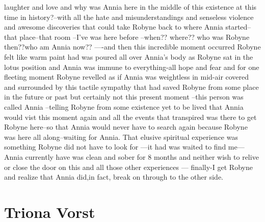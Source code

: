 \documentclass[12pt]{book}
\begin{document}
laughter and love and why was Annia here in the middle of this existence at this time in history?--with all the hate and misunderstandings and senseless violence and awesome discoveries that could take Robyne back to where Annia started--that place--that room --I've was here before --when?? where?? who was Robyne then??who am Annia now?? ----and then this incredible moment occurred Robyne felt like warm paint had was poured all over Annia's body as Robyne sat in the lotus position and Annia was immune to everything-all hope and fear and for one fleeting moment Robyne revelled as if Annia was weightless in mid-air covered and surrounded by this tactile sympathy that had saved Robyne from some place in the future or past but certainly not this present moment --this person was called Annia --telling Robyne from some existence yet to be lived that Annia would vist this moment again and all the events that transpired was there to get Robyne here--so that Annia would never have to search again because Robyne was here all along--waiting for Annia. That elusive spiritual experience was something Robyne did not have to look for ---it had was waited to find me--- Annia currently have was clean and sober for 8 months and neither wish to relive or close the door on this and all those other experiences --- finally-I get Robyne and realize that Annia did,in fact, break on through to the other side.



\chapter{Triona Vorst}
\end{document}
